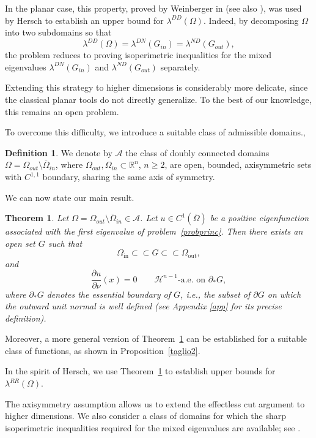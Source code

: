 \documentclass[oneside,a4paper,11pt,notitlepage]{article}
\newcommand{\Simm}{\mathcal A}
\theoremstyle{plain}
\newtheorem{teor}{Theorem}
\numberwithin{teor}{section}
\numberwithin{equation}{section}
\newenvironment{teorema}{\begin{teor}}{\end{teor}}
\theoremstyle{definition}
\newtheorem{defi}[defi]{Definition}
\newenvironment{definizione}{\begin{defi}}{\end{defi}}
\theoremstyle{plain}
\theoremstyle{plain}
\theoremstyle{plain}
\theoremstyle{plain}
\theoremstyle{definition}
\theoremstyle{definition}
\theoremstyle{plain}
\begin{document}
In the planar case, this property, proved by Weinberger in \cite{Weinberger} (see also \cite{BBV}), was used by Hersch \cite{hersch} to establish an upper bound for $\lambda^{DD}(\Omega)$. Indeed, by decomposing $\Omega$ into two subdomains so that
\[
\lambda^{DD}(\Omega) = \lambda^{DN}(G_{in}) = \lambda^{ND}(G_{out}),
\]
the problem reduces to proving isoperimetric inequalities for the mixed eigenvalues $\lambda^{DN}(G_{in})$ and $\lambda^{ND}(G_{out})$ separately.

Extending this strategy to higher dimensions is considerably more delicate, since the classical planar tools do not directly generalize. To the best of our knowledge, this remains an open problem.

To overcome this difficulty, we introduce a suitable class of admissible domains.,
\begin{definizione}
\label{assisimm}
We denote by $\Simm$ the class of doubly connected domains 
$\Omega = \Omega_{out} \setminus \overline{\Omega}_{in}$, where 
$\Omega_{out}, \Omega_{in} \subset \mathbb{R}^n$, $n \ge 2$, are open, bounded, axisymmetric sets with $C^{1,1}$ boundary, sharing the same axis of symmetry.\end{definizione}

We can now state our main result.

\begin{teorema}\label{taglio}
Let $\Omega = \Omega_{out} \setminus \overline{\Omega}_{in} \in \Simm$. Let $u \in C^{1}(\overline{\Omega})$ be a positive eigenfunction associated with the first eigenvalue of problem~\eqref{probprinc}. Then there exists an open set $G$ such that
\[
\Omega_{\mathrm{in}} \subset\subset G \subset\subset \Omega_{\mathrm{out}},
\]
and
\[
\frac{\partial u}{\partial \nu}(x) = 0
\qquad \mathcal{H}^{n-1}\text{-a.e.\ on } \partial_\ast G,
\]
where $\partial_\ast G$ denotes the essential boundary of $G$, i.e., the subset of $\partial G$ on which the outward unit normal is well defined (see Appendix \ref{app} for its precise definition).


\end{teorema}

Moreover, a more general version of Theorem~\ref{taglio} can be established for a suitable class of functions, as shown in Proposition~\ref{taglio2}.


In the spirit of Hersch, we use Theorem~\ref{taglio} to establish upper bounds for $\lambda^{RR}(\Omega)$.

The axisymmetry assumption allows us to extend the effectless cut argument to higher dimensions. We also consider a class of domains for which the sharp isoperimetric inequalities required for the mixed eigenvalues are available; see \cite{DPP,Paoli_Piscitelli_Trani}.
\end{document}
